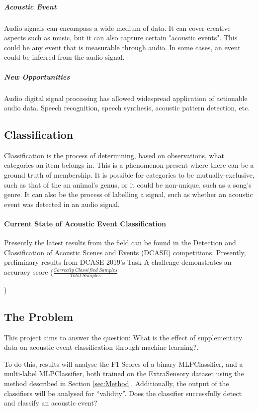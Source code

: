 \documentclass{UoNMCHA}
\newcommand{\inlineQuote}[1]{``#1''}
\numberwithin{equation}{section}
\begin{document}
{\subparagraph{Acoustic Event}
Audio signals can encompass a wide medium of data. It can cover creative aspects such as music, but it can also capture certain "acoustic events". This could be any event that is measurable through audio. In some cases, an event could be inferred from the audio signal.

\subparagraph{New Opportunities}
Audio digital signal processing has allowed widespread application of actionable audio data. Speech recognition, speech synthesis, acoustic pattern detection, etc.

\subsection{Classification}
Classification is the process of determining, based on observations, what categories an item belongs in. This is a phenomenon present where there can be a ground truth of membership.
It is possible for categories to be mutually-exclusive, such as that of the an animal's genus, or it could be non-unique, such as a song's genre. It can also be the process of labelling a signal, such as whether an acoustic event was detected in an audio signal.

\paragraph{Current State of Acoustic Event Classification}
Presently the latest results from the field can be found in the Detection and Classification of
Acoustic Scenes and Events (DCASE) competitions. Presently, preliminary results from DCASE 2019's Task A challenge demonstrates an accuracy score ({\small }$ \frac{Correctly\;Classified\;Samples}{Total\;Samples} $}) \cite{Mesaros2018_DCASE}

\subsection{The Problem}
This project aims to answer the question: What is the effect of supplementary data on acoustic event classification through machine learning?. 

To do this, results will analyse the F1 Scores of a binary MLPClassifier, and a multi-label MLPClassifier, both trained on the ExtraSensory dataset using the method described in Section \ref{sec:Method}.
Additionally, the output of the classifiers will be analysed for \inlineQuote{validity}. Does the classifier successfully detect and classify an acoustic event?
\end{document}
